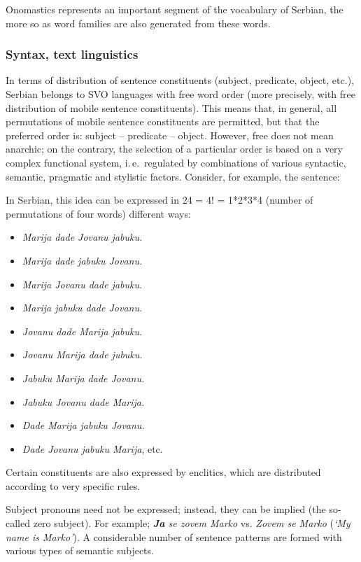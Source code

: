 {\begin{multicols}{2}
Onomastics represents an important segment of the vocabulary of Serbian, the more so as word families are also generated from these words. 

\subsubsection {Syntax, text linguistics}

In terms of distribution of sentence constituents (subject, predicate, object, etc.), Serbian belongs to SVO languages with free word order (more precisely, with free distribution of mobile sentence constituents). This means that, in general, all permutations of mobile sentence constituents are permitted, but that the preferred order is: subject – predicate – object. However, free does not mean anarchic; on the contrary, the selection of a particular order is based on a very complex functional system, i.\,e.~regulated by combinations of various syntactic, semantic, pragmatic and stylistic factors.  Consider, for example, the sentence:
In Serbian, this idea can be expressed in 24 = 4! = 1*2*3*4 (number of permutations of four words) different ways:
\begin{itemize}
 \item \textit{Marija dade Jovanu jabuku.}
 \item \textit{Marija dade jabuku Jovanu.}
\item \textit{Marija Jovanu dade jabuku.} 
\item \textit{Marija jabuku dade Jovanu.}
\item \textit{Jovanu dade Marija jabuku.}
\item \textit{Jovanu Marija dade jubuku.}
\item \textit{Jabuku Marija dade Jovanu.}
\item \textit{Jabuku Jovanu dade Marija.}
\item \textit{Dade Marija jabuku Jovanu. }
\item \textit{Dade Jovanu jabuku Marija}, etc.
\end{itemize}
Certain constituents are also expressed by enclitics, which are distributed according to very specific rules. 

Subject pronouns need not be expressed; instead, they can be implied (the so-called zero subject). For example; \textit{\textbf{Ja} se zovem Marko} vs. \textit{Zovem se Marko} (\textit{‘My name is Marko’}). A considerable number of sentence patterns are formed with various types of semantic subjects. 


\end{multicols}}
